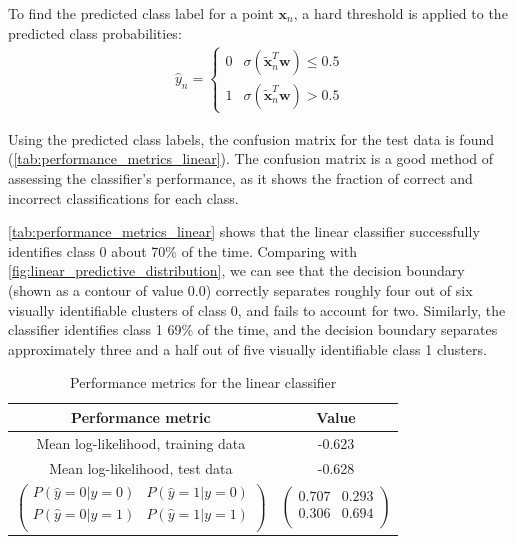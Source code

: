 \documentclass[a4paper]{article}
\begin{document}
    To find the predicted class label for a point $\boldsymbol{x}_n$, a hard threshold is applied to the predicted class
    probabilities:
    \begin{align*}
        \hat{y}_n = \begin{cases}
                        0 & \sigma(\tilde{\boldsymbol{x}}_n^T \boldsymbol{w}) \leq 0.5 \\
                        1 & \sigma(\tilde{\boldsymbol{x}}_n^T \boldsymbol{w}) > 0.5
                    \end{cases}
    \end{align*}

    Using the predicted class labels, the confusion matrix for the test data is found
    (\autoref{tab:performance_metrics_linear}). The confusion matrix is a good method of assessing the classifier's
    performance, as it shows the fraction of correct and incorrect classifications for each class.

    \autoref{tab:performance_metrics_linear} shows that the linear classifier successfully identifies class 0 about
    70\% of the time. Comparing with \autoref{fig:linear_predictive_distribution}, we can see that the decision boundary
    (shown as a contour of value 0.0) correctly separates roughly four out of six visually identifiable clusters of
    class 0, and fails to account for two. Similarly, the classifier identifies class 1 69\% of the time, and the
    decision boundary separates approximately three and a half out of five visually identifiable class 1 clusters.

    \begin{table}[h]
        \label{tab:performance_metrics_linear}
        \centering
        \begin{tabular}{c|c}
            \textbf{Performance metric} & \textbf{Value} \\
            \hline
            Mean log-likelihood, training data & -0.623 \\
            Mean log-likelihood, test data & -0.628 \\
            $\begin{pmatrix}
                 P(\hat{y}=0 | y=0) & P(\hat{y}=1 | y=0) \\
                 P(\hat{y}=0 | y=1) & P(\hat{y}=1 | y=1) \\
            \end{pmatrix}$ &
            $\begin{pmatrix}
                0.707 & 0.293 \\
                0.306 & 0.694 \\
            \end{pmatrix}$ \\
        \end{tabular}
        \caption{Performance metrics for the linear classifier}
    \end{table}
\end{document}
